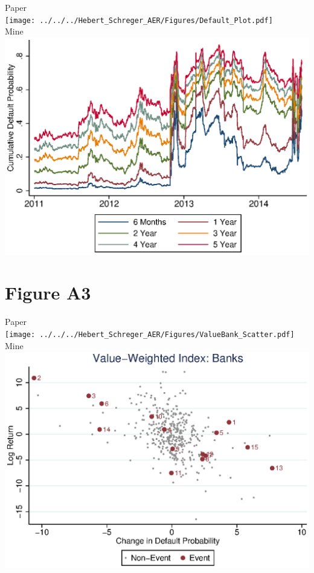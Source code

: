 \documentclass{article}
\begin{document}
\newpage Paper \\
\texttt{[image: ../../../Hebert\_Schreger\_AER/Figures/Default\_Plot.pdf]}\\
Mine \\
\includegraphics[scale = .8]{Default_Plot.eps}\\

\newpage
\section{Figure A3}

Paper \\
\texttt{[image: ../../../Hebert\_Schreger\_AER/Figures/ValueBank\_Scatter.pdf]}\\
Mine \\
\includegraphics[scale = .8]{ValueBank_Scatter.eps}\\
\end{document}

